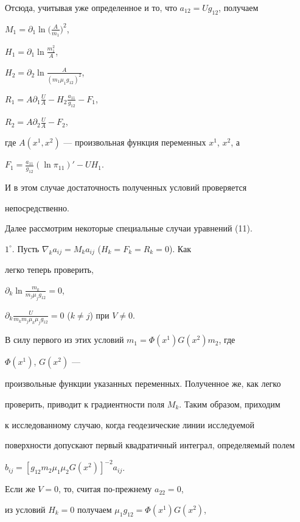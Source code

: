 Отсюда, учитывая уже определенное и то, что $a_{12}=U g_{12}$, получаем 


$M_1=\partial_1\ln\big(\frac{A}{m_1}\big)^2$, 


$H_1=\partial_1\ln\frac{m^2_1}{A}$, 


$H_2=\partial_2\ln\frac{A}{(m_1\mu_1g_{12})^2}$, 


$R_1=A\partial_1\frac{U}{A}-H_2\frac{a_{11}}{g_{12}}-F_1$, 


$R_2=A\partial_2\frac{U}{A}-F_2$, 


где $A(x^1,x^2)$ --- произвольная функция переменных $x^1$, $x^2$, а


$F_1=\frac{a_{11}}{g_{12}}(\ln\pi_{11})'-U H_1$. 


 


И в этом случае достаточность полученных условий проверяется 


непосредственно. 


 


Далее рассмотрим некоторые специальные случаи уравнений (11).  


 


$1^\circ$. Пусть $\nabla_k a_{ij}=M_k a_{ij}$ ($H_k=F_k=R_k=0$). Как 


легко теперь проверить, 


$\partial_k\ln\frac{m_k}{m_j\mu_j g_{12}}=0$, 


$\partial_k\frac{U}{m_k m_j\mu_k\mu_j g_{12}}=0$ ($k\ne j$) при $V\ne0$. 


В силу первого из этих условий $m_1=\Phi(x^1)G(x^2)m_2$, где 


$\Phi(x^1)$, $G(x^2)$ --- 


произвольные функции указанных переменных. Полученное же, как легко 


проверить, приводит к градиентности поля $M_k$. Таким образом, приходим 


к исследованному случаю, когда геодезические линии исследуемой  


поверхности допускают первый квадратичный интеграл, определяемый полем 


$b_{ij}=[g_{12}m_2\mu_1\mu_2 G(x^2)]^{-2}a_{ij}$. 


 


Если же $V=0$, то, считая по-прежнему $a_{22}=0$, 


из условий $H_k=0$ получаем $\mu_1g_{12}=\Phi(x^1)G(x^2)$, 


